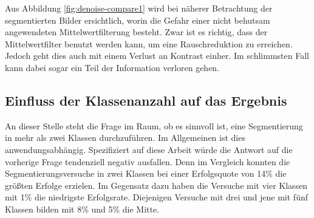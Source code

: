 			Aus Abbildung \ref{fig:denoise-compare1} wird bei näherer Betrachtung der segmentierten Bilder ersichtlich, worin die Gefahr einer nicht behutsam angewendeten Mittelwertfilterung besteht. Zwar ist es richtig, dass der Mittelwertfilter benutzt werden kann, um eine Rauschreduktion zu erreichen. Jedoch geht dies auch mit einem Verlust an Kontrast einher. Im schlimmsten Fall kann dabei sogar ein Teil der Information verloren gehen. 
		
		\subsection{Einfluss der Klassenanzahl auf das Ergebnis}
		\label{sub:influence-of-classes}
			An dieser Stelle steht die Frage im Raum, ob es sinnvoll ist, eine Segmentierung in mehr als zwei Klassen durchzuführen. Im Allgemeinen ist dies anwendungsabhängig. Spezifiziert auf diese Arbeit würde die Antwort auf die vorherige Frage tendenziell negativ ausfallen. Denn im Vergleich konnten die Segmentierungsversuche in zwei Klassen bei einer Erfolgsquote von 14\% die größten Erfolge erzielen. Im Gegensatz dazu haben die Versuche mit vier Klassen mit 1\% die niedrigste Erfolgsrate. Diejenigen Versuche mit drei und jene mit fünf Klassen bilden mit 8\% und 5\% die Mitte. 
